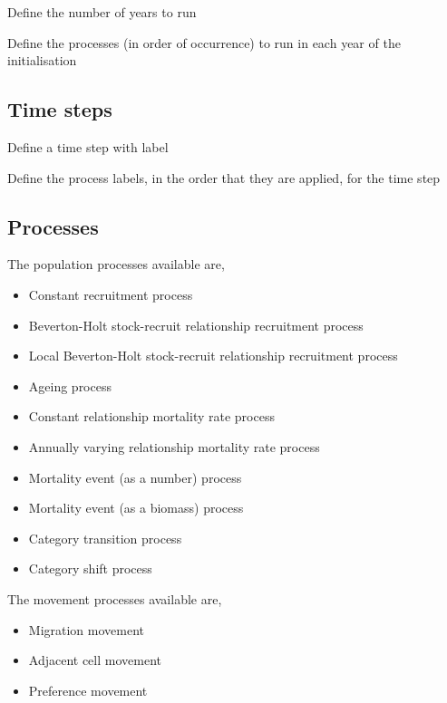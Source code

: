  {Define the number of years to run}

 {Define the processes (in order of occurrence) to run in each year of the initialisation}

\subsection{Time steps}

 {Define a time step with label}

 {Define the process labels, in the order that they are applied, for the time step}

\subsection{Processes}

The population processes available are,

\begin{itemize}
	\item Constant recruitment process
  \item Beverton-Holt stock-recruit relationship recruitment process
  \item Local Beverton-Holt stock-recruit relationship recruitment process
	\item Ageing process
	\item Constant relationship mortality rate process
	\item Annually varying relationship mortality rate process
	\item Mortality event (as a number) process
	\item Mortality event (as a biomass) process
	\item Category transition process
	\item Category shift process
\end{itemize}

The movement processes available are,

\begin{itemize}
	\item Migration movement
	\item Adjacent cell movement
	\item Preference movement
\end{itemize}

